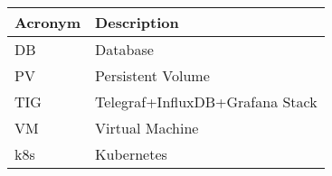 \addtocounter{table}{-1}
\begin{longtable}{p{}p{}}\hline
\textbf{Acronym} & \textbf{Description}  \\\hline

DB & Database \\\hline
PV & Persistent Volume \\\hline
TIG & Telegraf+InfluxDB+Grafana Stack \\\hline
VM & Virtual Machine \\\hline
k8s & Kubernetes \\\hline
\end{longtable}
